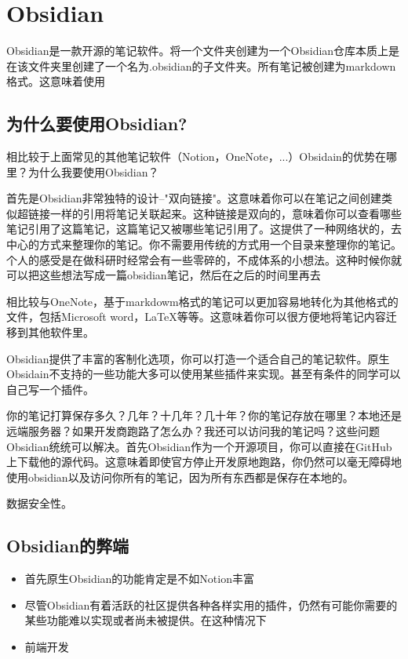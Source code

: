 \section{Obsidian}
  Obsidian是一款开源的笔记软件。将一个文件夹创建为一个Obsidian仓库本质上是在该文件夹里创建了一个名为.obsidian的子文件夹。所有笔记被创建为markdown格式。这意味着使用

  \subsection{为什么要使用Obsidian?}
  相比较于上面常见的其他笔记软件（Notion，OneNote，...）Obsidain的优势在哪里？为什么我要使用Obsidian？
  
  首先是Obsidian非常独特的设计--"双向链接"。这意味着你可以在笔记之间创建类似超链接一样的引用将笔记关联起来。这种链接是双向的，意味着你可以查看哪些笔记引用了这篇笔记，这篇笔记又被哪些笔记引用了。这提供了一种网络状的，去中心的方式来整理你的笔记。你不需要用传统的方式用一个目录来整理你的笔记。个人的感受是在做科研时经常会有一些零碎的，不成体系的小想法。这种时候你就可以把这些想法写成一篇obsidian笔记，然后在之后的时间里再去
  
  相比较与OneNote，基于markdowm格式的笔记可以更加容易地转化为其他格式的文件，包括Microsoft word，LaTeX等等。这意味着你可以很方便地将笔记内容迁移到其他软件里。
  
  Obsidian提供了丰富的客制化选项，你可以打造一个适合自己的笔记软件。原生Obsidain不支持的一些功能大多可以使用某些插件来实现。甚至有条件的同学可以自己写一个插件。
  
  你的笔记打算保存多久？几年？十几年？几十年？你的笔记存放在哪里？本地还是远端服务器？如果开发商跑路了怎么办？我还可以访问我的笔记吗？这些问题Obsidian统统可以解决。首先Obsidian作为一个开源项目，你可以直接在GitHub上下载他的源代码。这意味着即使官方停止开发原地跑路，你仍然可以毫无障碍地使用obsidian以及访问你所有的笔记，因为所有东西都是保存在本地的。
  
  数据安全性。


  \subsection{Obsidian的弊端}
  \begin{itemize}
  \item 首先原生Obsidian的功能肯定是不如Notion丰富
  \item 尽管Obsidian有着活跃的社区提供各种各样实用的插件，仍然有可能你需要的某些功能难以实现或者尚未被提供。在这种情况下
  \item 前端开发
  \end{itemize}

